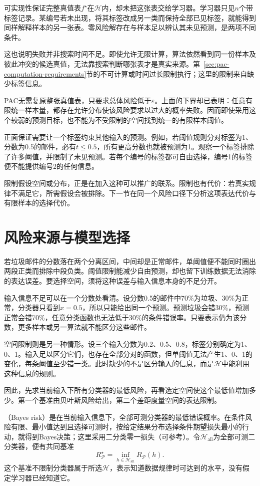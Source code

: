 可实现性保证完整真值表$f^\star$在$\mathcal H$内，却未把这张表交给学习器。学习器只见$n$个带标签记录。某编号若未出现，将其标签改成另一类而保持全部已见标签，就能得到同样解释样本的另一张表。零风险解存在与样本足以辨认其未见预测，是两项不同条件。

这也说明失败并非搜索时间不足。即使允许无限计算，算法依然看到同一份样本及彼此冲突的候选真值，无法靠搜索判断哪张表才是真实来源。第~\ref{sec:pac-computation-requirements}节的不可计算或时间过长限制执行；这里的限制来自缺少标签信息。

PAC无需复原整张真值表，只要求总体风险低于$\varepsilon$。上面的下界却已表明：任意有限统一样本量，都存在允许分布使该风险要求以过大的概率失败。因而即使采用这个较弱的预测目标，也不能为不受限制的空间找到统一的有限样本阈值。

正面保证需要让一个标签约束其他输入的预测。例如，若阈值规则分对标签为1、分数为0.5的邮件，必有$t\leq0.5$，所有更高分数也就被预测为1。观察一个标签排除了许多阈值，并限制了未见预测。若每个编号的标签都可自由选择，编号1的标签便不能提供编号2的任何信息。

限制假设空间或分布，正是在加入这种可以推广的联系。限制也有代价：若真实规律不满足它，所需假设会被排除。下一节在同一个风险口径下分析这项表达代价与有限样本的选择代价。

\section{风险来源与模型选择}
\label{sec:statistical-model-selection}

若垃圾邮件的分数落在两个分离区间，中间却是正常邮件，单阈值便不能同时圈出两段正类而排除中段负类。阈值限制能减少自由预测，却也留下训练数据无法消除的表达误差。要选择空间，须将这种误差与输入信息本身的不足分开。

输入信息不足可以在一个分数处看清。设分数0.5的邮件中70\%为垃圾、30\%为正常，分类器只看到$x=0.5$，所以只能给出同一个预测。预测垃圾会错30\%，预测正常会错70\%，任意分类函数也无法低于30\%的条件错误率。只要表示仍为该分数，更多样本或另一算法就不能区分这些邮件。

空间限制则是另一种情形。设三个输入分数为0.2、0.5、0.8，标签分别确定为1、0、1。输入足以区分它们，也存在全部分对的函数，但单阈值无法产生1、0、1的变化，每条阈值至少错一类。此时缺少的不是区分输入的信息，而是$\mathcal H$中能利用这种信息的规则。

因此，先求当前输入下所有分类器的最低风险，再看选定空间使这个最低值增加多少。第一个基准由贝叶斯风险给出，第二个差距度量空间的表达限制。

（Bayes risk）是在当前输入信息下，全部可测分类器的最低错误概率。在条件风险有限、最小值达到且选择可测时，按给定结果分布选择条件期望损失最小的行动，就得到Bayes决策；这里采用二分类零一损失（可参考）。令$\mathcal H_{\mathrm{all}}$为全部可测二分类器，便有共同基准
\begin{equation}
 R_{\mathcal P}^\star=\inf_{h\in\mathcal H_{\mathrm{all}}}R_{\mathcal P}(h).
 \label{eq:bayes-risk}
\end{equation}
这个基准不限制分类器属于所选$\mathcal H$，表示知道数据规律时可达到的水平，没有假定学习器已经知道它。

